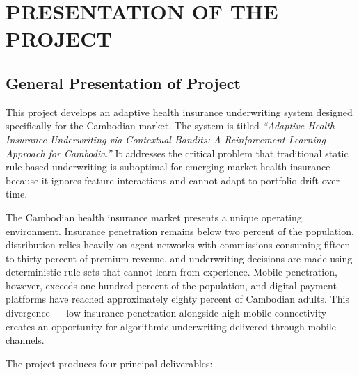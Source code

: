 \chapter{PRESENTATION OF THE PROJECT}\label{chapter-ii.-presentation-of-the-project}

\section{General Presentation of Project}\label{general-presentation-of-project}

This project develops an adaptive health insurance underwriting system designed specifically for the Cambodian market. The system is titled \emph{``Adaptive Health Insurance Underwriting via Contextual Bandits: A Reinforcement Learning Approach for Cambodia.''} It addresses the critical problem that traditional static rule-based underwriting is suboptimal for emerging-market health insurance because it ignores feature interactions and cannot adapt to portfolio drift over time.

The Cambodian health insurance market presents a unique operating environment. Insurance penetration remains below two percent of the population, distribution relies heavily on agent networks with commissions consuming fifteen to thirty percent of premium revenue, and underwriting decisions are made using deterministic rule sets that cannot learn from experience. Mobile penetration, however, exceeds one hundred percent of the population, and digital payment platforms have reached approximately eighty percent of Cambodian adults. This divergence --- low insurance penetration alongside high mobile connectivity --- creates an opportunity for algorithmic underwriting delivered through mobile channels.

The project produces four principal deliverables:

